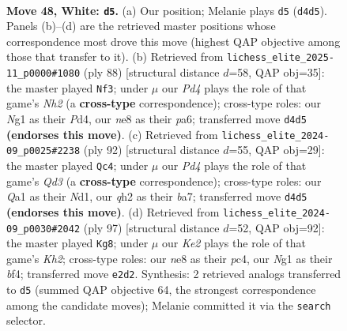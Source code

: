 \documentclass[11pt]{article}
\begin{document}
\clearpage

\begin{figure}[p]\centering
\begin{subfigure}{0.46\textwidth}\centering
\resizebox{\linewidth}{!}{%
\newchessgame
\chessboard[
  setfen={4n3/3b2k1/p7/4Pp1p/3P2p1/N7/4KP1q/Q5N1 w - - 0 48},
  showmover=false,
  pgfstyle=straightmove, color=movearrow, markmove={d4-d5}
]}
\caption{}
\end{subfigure}\hfill
\begin{subfigure}{0.46\textwidth}\centering
\resizebox{\linewidth}{!}{%
\newchessgame
\chessboard[
  setfen={8/1p4pk/pP2n2p/P7/3Pq3/8/6PN/3Q3K w - - 4 45},
  showmover=false,
  pgfstyle=straightmove, color=movearrow, markmove={h2-f3}
]}
\caption{}
\end{subfigure}
\\[4pt]
\begin{subfigure}{0.46\textwidth}\centering
\resizebox{\linewidth}{!}{%
\newchessgame
\chessboard[
  setfen={6k1/b5p1/4qn1p/4N3/8/3Q2PP/5P2/3N2K1 w - - 8 47},
  showmover=false,
  pgfstyle=straightmove, color=movearrow, markmove={d3-c4}
]}
\caption{}
\end{subfigure}\hfill
\begin{subfigure}{0.46\textwidth}\centering
\resizebox{\linewidth}{!}{%
\newchessgame
\chessboard[
  setfen={5n2/4Q1pk/1p1P4/2p5/p1P2Bq1/P6p/1P2NK2/8 b - - 0 49},
  showmover=false,
  pgfstyle=straightmove, color=movearrow, markmove={h7-g8}
]}
\caption{}
\end{subfigure}
\caption{\textbf{Move 48, White: \texttt{d5}.} (a) Our position; Melanie plays \texttt{d5} (\texttt{d4d5}). Panels (b)--(d) are the retrieved master positions whose correspondence most drove this move (highest QAP objective among those that transfer to it). (b) Retrieved from \texttt{lichess\_elite\_2025-11\_p0000\#1080} (ply 88) [structural distance $d$=58, QAP obj=35]: the master played \texttt{Nf3}; under $\mu$ our \emph{Pd4} plays the role of that game's \emph{Nh2} (a \textbf{cross-type} correspondence); cross-type roles: our \emph{N}g1 as their \emph{P}d4, our \emph{n}e8 as their \emph{p}a6; transferred move \texttt{d4d5} \textbf{(endorses this move)}. (c) Retrieved from \texttt{lichess\_elite\_2024-09\_p0025\#2238} (ply 92) [structural distance $d$=55, QAP obj=29]: the master played \texttt{Qc4}; under $\mu$ our \emph{Pd4} plays the role of that game's \emph{Qd3} (a \textbf{cross-type} correspondence); cross-type roles: our \emph{Q}a1 as their \emph{N}d1, our \emph{q}h2 as their \emph{b}a7; transferred move \texttt{d4d5} \textbf{(endorses this move)}. (d) Retrieved from \texttt{lichess\_elite\_2024-09\_p0030\#2042} (ply 97) [structural distance $d$=52, QAP obj=92]: the master played \texttt{Kg8}; under $\mu$ our \emph{Ke2} plays the role of that game's \emph{Kh2}; cross-type roles: our \emph{n}e8 as their \emph{p}c4, our \emph{N}g1 as their \emph{b}f4; transferred move \texttt{e2d2}. Synthesis: 2 retrieved analogs transferred to \texttt{d5} (summed QAP objective 64, the strongest correspondence among the candidate moves); Melanie committed it via the \texttt{search} selector.}
\label{fig:thought-m94}
\end{figure}
\end{document}

